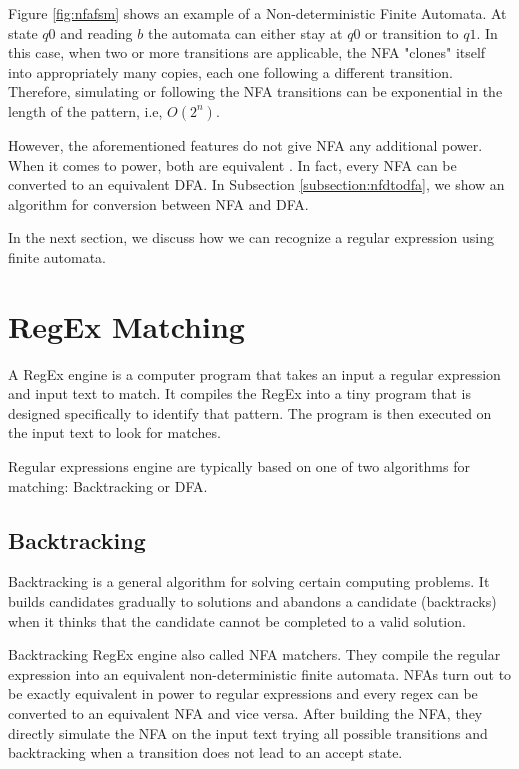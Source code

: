 Figure \ref{fig:nfafsm} shows an example of a Non-deterministic Finite Automata. At state $q0$ and reading $b$ the automata can either stay at $q0$ or transition to $q1$. In this case, when two or more transitions are applicable, the NFA "clones" itself into appropriately many copies, each one following a different transition. Therefore, simulating or following the NFA transitions can be exponential in the length of the pattern, i.e, $O(2^n)$.

However, the aforementioned features do not give NFA any additional power. When it comes to power, both are equivalent \cite{nfadfaeq}. In fact, every NFA can be converted to an equivalent DFA. In Subsection \ref{subsection:nfdtodfa}, we show an algorithm for conversion between NFA and DFA.

In the next section, we discuss how we can recognize a regular expression using finite automata.

\newpage
\section{RegEx Matching}

A RegEx engine is a computer program that takes an input a regular expression and input text to match.
It compiles the RegEx into a tiny program that is designed specifically to identify that pattern.
The program is then executed on the input text to look for matches.

Regular expressions engine are typically based on one of two algorithms for matching: Backtracking or DFA.

\subsection{Backtracking}

Backtracking is a general algorithm for solving certain computing problems. It builds candidates gradually to solutions and abandons a candidate (backtracks) when it thinks that the candidate cannot be completed to a valid solution.

Backtracking RegEx engine also called NFA matchers. They compile the regular expression into an equivalent non-deterministic finite automata. NFAs turn out to be exactly equivalent in power to regular expressions and every regex can be converted to an equivalent NFA and vice versa. After building the NFA, they directly simulate the NFA on the input text trying all possible transitions and backtracking when a transition does not lead to an accept state.

